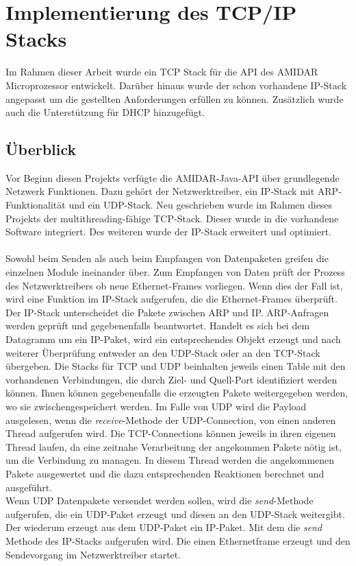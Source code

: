 \chapter{Implementierung des TCP/IP Stacks}
Im Rahmen dieser Arbeit wurde ein TCP Stack für die API des AMIDAR Microprozessor entwickelt. Darüber hinaus wurde der schon vorhandene IP-Stack angepasst um die gestellten Anforderungen erfüllen zu können. Zusätzlich wurde auch die Unterstützung für DHCP hinzugefügt.

\section{Überblick}
Vor Beginn diesen Projekts verfügte die AMIDAR-Java-API über grundlegende Netzwerk Funktionen. Dazu gehört der Netzwerktreiber, ein IP-Stack mit ARP-Funktionalität und ein UDP-Stack. Neu geschrieben wurde im Rahmen dieses Projekts der multithreading-fähige TCP-Stack. Dieser wurde in die vorhandene Software integriert. Des weiteren wurde der IP-Stack erweitert und optimiert.\\\\
Sowohl beim Senden als auch beim Empfangen von Datenpaketen greifen die einzelnen Module ineinander über. Zum Empfangen von Daten prüft der Prozess des Netzwerktreibers ob neue Ethernet-Frames vorliegen. Wenn dies der Fall ist, wird eine Funktion im IP-Stack aufgerufen, die die Ethernet-Frames überprüft. Der IP-Stack unterscheidet die Pakete zwischen ARP und IP. ARP-Anfragen werden geprüft und gegebenenfalls beantwortet. Handelt es sich bei dem Datagramm um ein IP-Paket, wird ein entsprechendes Objekt erzeugt und nach weiterer Überprüfung entweder an den UDP-Stack oder an den TCP-Stack übergeben. Die Stacks für TCP und UDP beinhalten jeweils einen Table mit den vorhandenen Verbindungen, die durch Ziel- und Quell-Port identifiziert werden können. Ihnen können gegebenenfalls die erzeugten Pakete weitergegeben werden, wo sie zwischengespeichert werden. Im Falle von UDP wird die Payload ausgelesen, wenn die \textit{receive}-Methode der UDP-Connection, von einen anderen Thread aufgerufen wird. Die TCP-Connections können jeweils in ihren eigenen Thread laufen, da eine zeitnahe Verarbeitung der angekommen Pakete nötig ist, um die Verbindung zu managen. In diesem Thread werden die angekommenen Pakete ausgewertet und die dazu entsprechenden Reaktionen berechnet und ausgeführt. \\
Wenn UDP Datenpakete versendet werden sollen, wird die \textit{send}-Methode aufgerufen, die ein UDP-Paket erzeugt und diesen an den UDP-Stack weitergibt. Der wiederum erzeugt aus dem UDP-Paket ein IP-Paket. Mit dem die \textit{send} Methode des IP-Stacks aufgerufen wird. Die einen Ethernetframe erzeugt und den Sendevorgang im Netzwerktreiber startet.\\ \\
